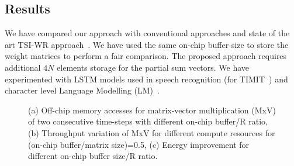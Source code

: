\documentclass[a4paper,10pt]{article}
\begin{document}
\subsection{Results}
We have compared our approach with conventional approaches and state of the art TSI-WR approach~\cite{park2020time}. We have used the same on-chip buffer size to store the weight matrices to perform a fair comparison. The proposed approach requires additional $4N$ elements storage for the partial sum vectors. We have experimented with LSTM models used in speech recognition (for TIMIT~\cite{garofolo1993timit}) and character level Language Modelling (LM)~\cite{sundermeyer2015feedforward}.
\begin{figure}[htb!]
	\centering
    \captionsetup{font=sf}	
	\caption{ (a) Off-chip memory accesses for matrix-vector multiplication (MxV) of two consecutive time-steps with different on-chip buffer/R ratio, (b) Throughput variation of MxV for different compute resources for (on-chip buffer/matrix size){=}0.5, (c) Energy improvement for different on-chip buffer size/R ratio.}
	\label{fig:throughputVsPF}
\end{figure}
\end{document}
